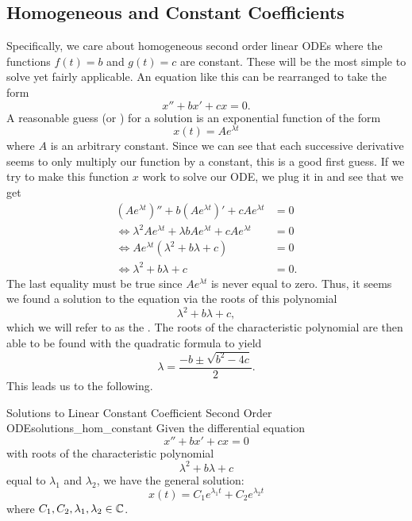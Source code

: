         \subsection{Homogeneous and Constant Coefficients}
        Specifically, we care about homogeneous second order linear ODEs where the functions $f(t)=b$ and $g(t)=c$ are constant.  These will be the most simple to solve yet fairly applicable. An equation like this can be rearranged to take the form
        \[
        x''+bx'+cx=0.
        \]
        A reasonable guess (or ) for a solution is an exponential function of the form
        \[
        x(t)=Ae^{\lambda t}
        \]
        where $A$ is an arbitrary constant. Since we can see that each successive derivative seems to only multiply our function by a constant, this is a good first guess. If we try to make this function $x$ work to solve our ODE, we plug it in and see that we get
        \begin{align*}
            \left(Ae^{\lambda t}\right)''+b\left(Ae^{\lambda t}\right)'+cAe^{\lambda t}&=0\\
            \iff\lambda^2 Ae^{\lambda t}+\lambda b Ae^{\lambda t} +c Ae^{\lambda t}&=0\\
            \iff Ae^{\lambda t}\left( \lambda^2 + b\lambda +c\right)&=0\\
            \iff \lambda^2 +b\lambda +c &=0.
        \end{align*}
        The last equality must be true since $Ae^{\lambda t}$ is never equal to zero.  Thus, it seems we found a solution to the equation via the roots of this polynomial
        \[
        \lambda^2+b\lambda +c,
        \]
        which we will refer to as the . The roots of the characteristic polynomial are then able to be found with the quadratic formula to yield
        \[
        \lambda=\frac{-b\pm \sqrt{b^2-4c}}{2}.
        \]
        This leads us to the following.
        
        \begin{prop}{Solutions to Linear Constant Coefficient Second Order ODE}{solutions_hom_constant}
        Given the differential equation
        \[
        x''+bx'+cx=0
        \]
        with roots of the characteristic polynomial
        \[
        \lambda^2+b\lambda +c
        \]
        equal to $\lambda_1$ and $\lambda_2$, we have the general solution:
        \[
        x(t)=C_1 e^{\lambda_1t}+C_2e^{\lambda_2t}
        \]
        where $C_1,C_2,\lambda_1,\lambda_2 \in \mathbb{C}$.
        \end{prop}
        
